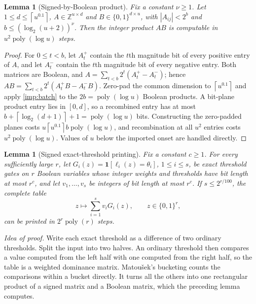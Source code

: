 \documentclass[11pt,letterpaper]{article}
\newtheorem{lemma}[theorem]{Lemma}
\theoremstyle{definition}
\theoremstyle{remark}
\newcommand{\Z}{\mathbb Z}
\newcommand{\poly}{\operatorname{poly}}
\newcommand{\ind}{\mathbf 1}
\newcommand{\ceil}[1]{\left\lceil #1\right\rceil}
\newcommand{\abs}[1]{\left|#1\right|}
\newcommand{\lgx}{\log_2}
\begin{document}
\begin{lemma}[Signed-by-Boolean product]\label{lem:signed-boolean-product}
Fix a constant \(\nu\ge1\). Let \(1\le d\le\ceil{u^{0.1}}\),
\(A\in\Z^{u\times d}\) and \(B\in\{0,1\}^{d\times u}\), with
\(\abs{A_{ij}}<2^b\) and \(b\le(\lgx(u+2))^\nu\). Then the integer
product \(AB\) is computable in \(u^2\poly(\log u)\) steps.
\end{lemma}
\begin{proof}
For \(0\le t<b\), let \(A_t^+\) contain the \(t\)th magnitude bit of
every positive entry of \(A\), and let \(A_t^-\) contain the \(t\)th
magnitude bit of every negative entry. Both matrices are Boolean, and
\(A=\sum_{t<b}2^t(A_t^+-A_t^-)\); hence
\(AB=\sum_{t<b}2^t(A_t^+B-A_t^-B)\). Zero-pad the common dimension to
\(\ceil{u^{0.1}}\) and apply \cref{imp:batch} to the
\(2b=\poly(\log u)\) Boolean products. A bit-plane product entry lies in
\([0,d]\), so a recombined entry has at most
\(b+\ceil{\lgx(d+1)}+1=\poly(\log u)\) bits. Constructing the zero-padded planes
costs \(u\ceil{u^{0.1}}b\poly(\log u)\), and recombination at all \(u^2\) entries costs
\(u^2\poly(\log u)\). Values of \(u\) below the imported onset are handled
directly.
\end{proof}

\begin{lemma}[Signed exact-threshold printing]\label{lem:signed-printer}
Fix a constant \(c\ge1\). For every sufficiently large \(r\), let
\(G_i(z)=\ind[\ell_i(z)=\theta_i]\), \(1\le i\le s\), be exact threshold
gates on \(r\) Boolean variables whose integer weights and thresholds
have bit length at most \(r^c\), and let \(v_1,\ldots,v_s\) be integers
of bit length at most \(r^c\). If \(s\le2^{r/100}\), the complete table
\[
 z\longmapsto\sum_{i=1}^sv_iG_i(z),\qquad z\in\{0,1\}^r,
\]
can be printed in \(2^r\poly(r)\) steps.
\end{lemma}

\emph{Idea of proof.} Write each exact threshold as a difference of two
ordinary thresholds. Split the input into two halves. An ordinary
threshold then compares a value computed from the left half with one
computed from the right half, so the table is a weighted dominance
matrix. Matou\v{s}ek's bucketing counts the comparisons within a bucket
directly. It turns all the others into one rectangular product of a
signed matrix and a Boolean matrix, which the preceding lemma computes.
\end{document}
